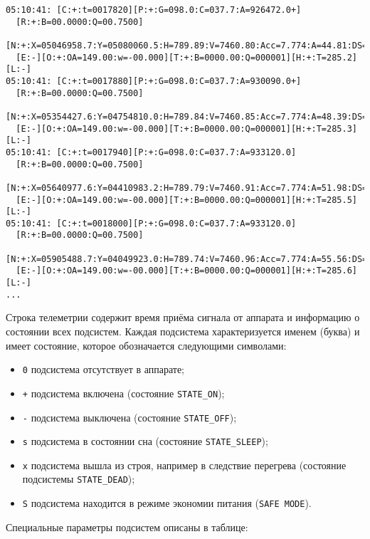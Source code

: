 \documentclass[12pt,a4paper]{article}
\begin{document}
\begin{verbatim}
05:10:41: [C:+:t=0017820][P:+:G=098.0:C=037.7:A=926472.0+]
  [R:+:B=00.0000:Q=00.7500]
  [N:+:X=05046958.7:Y=05080060.5:H=789.89:V=7460.80:Acc=7.774:A=44.81:DS=-]
  [E:-][O:+:OA=149.00:w=-00.000][T:+:B=0000.00:Q=000001][H:+:T=285.2][L:-]
05:10:41: [C:+:t=0017880][P:+:G=098.0:C=037.7:A=930090.0+]
  [R:+:B=00.0000:Q=00.7500]
  [N:+:X=05354427.6:Y=04754810.0:H=789.84:V=7460.85:Acc=7.774:A=48.39:DS=-]
  [E:-][O:+:OA=149.00:w=-00.000][T:+:B=0000.00:Q=000001][H:+:T=285.3][L:-]
05:10:41: [C:+:t=0017940][P:+:G=098.0:C=037.7:A=933120.0]
  [R:+:B=00.0000:Q=00.7500]
  [N:+:X=05640977.6:Y=04410983.2:H=789.79:V=7460.91:Acc=7.774:A=51.98:DS=-]
  [E:-][O:+:OA=149.00:w=-00.000][T:+:B=0000.00:Q=000001][H:+:T=285.5][L:-]
05:10:41: [C:+:t=0018000][P:+:G=098.0:C=037.7:A=933120.0]
  [R:+:B=00.0000:Q=00.7500]
  [N:+:X=05905488.7:Y=04049923.0:H=789.74:V=7460.96:Acc=7.774:A=55.56:DS=-]
  [E:-][O:+:OA=149.00:w=-00.000][T:+:B=0000.00:Q=000001][H:+:T=285.6][L:-]
...
\end{verbatim}

Строка телеметрии содержит время приёма сигнала от аппарата и информацию о состоянии всех
подсистем. Каждая подсистема характеризуется именем (буква) и имеет состояние, которое
обозначается следующими символами:

\begin{itemize}
\item \verb'0' подсистема отсутствует в аппарате;
\item \verb'+' подсистема включена (состояние \verb'STATE_ON');
\item \verb'-' подсистема выключена (состояние \verb'STATE_OFF');
\item \verb's' подсистема в состоянии сна (состояние \verb'STATE_SLEEP');
\item \verb'x' подсистема вышла из строя, например в следствие перегрева (состояние
  подсистемы \verb'STATE_DEAD');
\item \verb'S' подсистема находится в режиме экономии питания (\verb'SAFE MODE').
\end{itemize}

Специальные параметры подсистем описаны в таблице:
\end{document}
